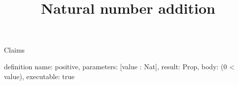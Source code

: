 \begin{lexlean}{Claims}
\title{Natural number addition}
\begin{semanticmodule}
definition{
  name: positive,
  parameters: [value : Nat],
  result: Prop,
  body: (0 < value),
  executable: true
}
\end{semanticmodule}
\end{lexlean}
